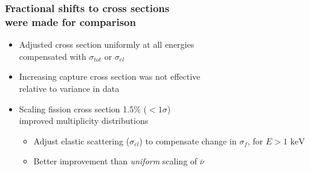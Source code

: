 \documentclass[xcolor=dvipsnames,hyperref={pdfpagelabels=false},unknownkeysallowed]{beamer}
\newcommand{\nubar}[0]{\ensuremath{\overline{\nu}} }
\newcommand{\colG}[1]{{\color{Gray!110} #1}}
\newlength{\wideitemsep}
\let\olditem\item
\renewcommand{\item}{\setlength{\itemsep}{\wideitemsep}\olditem}
\begin{document}
\begin{frame}
    \frametitle{Fractional shifts to cross sections \\ were made for comparison }
\begin{itemize}
    \item[] Adjusted cross section uniformly at all energies 
        \\ \colG{compensated with $\sigma_{tot}$ or $\sigma_{el}$}
    \item[] Increasing capture cross section was not effective \\
        \colG{relative to variance in data}
    \item[] Scaling fission cross section 1.5\% ($<1 \sigma$) 
        \\ improved multiplicity distributions
        \begin{itemize} \vspace{0.1in}
            \item Adjust elastic scattering ($\sigma_{el}$) to compensate change in $\sigma_f$, for ${E > 1 \text { keV}}$
            \item Better improvement than \emph{uniform} scaling of $\nubar$
        \end{itemize}
\end{itemize} 
\end{frame} 



\setcounter{framenumber}{\value{finalframe}}
\end{document}
